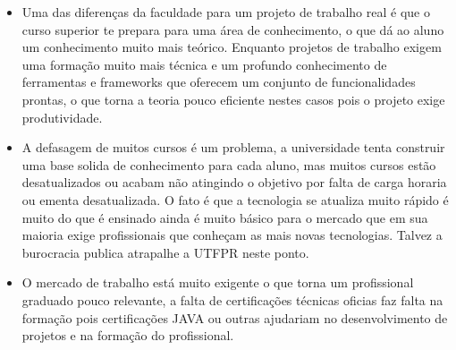 \begin{itemize}
    \item Uma das diferenças da faculdade para um projeto de trabalho real é que o curso superior te prepara para uma área de conhecimento, o que dá ao aluno um conhecimento muito mais teórico. Enquanto projetos de trabalho exigem uma formação muito mais técnica e um profundo conhecimento de ferramentas e frameworks que oferecem um conjunto de funcionalidades prontas, o que torna a teoria pouco eficiente nestes casos pois o projeto exige produtividade.
    
    \item A defasagem de muitos cursos é um problema, a universidade tenta construir uma base solida de conhecimento para cada aluno, mas muitos cursos estão desatualizados ou acabam não atingindo o objetivo por falta de carga horaria ou ementa desatualizada. O fato é que a tecnologia se atualiza muito rápido é muito do que é ensinado ainda é muito básico para o mercado que em sua maioria exige profissionais que conheçam as mais novas tecnologias. Talvez a burocracia publica atrapalhe a UTFPR neste ponto.
    
    \item O mercado de trabalho está muito exigente o que torna um profissional graduado pouco relevante, a falta de certificações técnicas oficias faz falta na formação pois certificações JAVA ou outras ajudariam no desenvolvimento de projetos e na formação do profissional.
    
\end{itemize}{}








